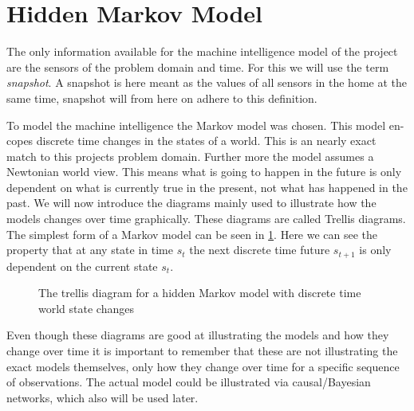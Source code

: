 \section{Hidden Markov Model}
The only information available for the machine intelligence model  of the project are the sensors of the problem domain and time. For this we will use the term \emph{snapshot}. A snapshot is here meant as the values of all sensors in the home at the same time, snapshot will from here on adhere to this definition.

To model the machine intelligence the Markov model was chosen. This model en-copes discrete time changes in the states of a world. This is an nearly exact match to this projects problem domain. Further more the model assumes a Newtonian world view. This means what is going to happen in the future is only dependent on what is currently true in the present, not what has happened in the past. We will now introduce the diagrams mainly used to illustrate how the models changes over time graphically. These diagrams are called Trellis diagrams. The simplest form of a Markov model can be seen in \cref{fig:1stMarkovModel}. Here we can see the property that at any state in time $s_t$ the next discrete time future $s_{t+1}$ is only dependent on the current state $s_t$.

\begin{figure}[htbp]
\centering
{}
\caption[Trellis diagram for a simple Markov model]{The trellis diagram for a hidden Markov model with discrete time world state changes}\label{fig:1stMarkovModel}
\end{figure}
Even though these diagrams are good at illustrating the models and how they change over time it is important to remember that these are not illustrating the exact models themselves, only how they change over time for a specific sequence of observations. The actual model could be illustrated via causal/Bayesian networks, which also will be used later.

